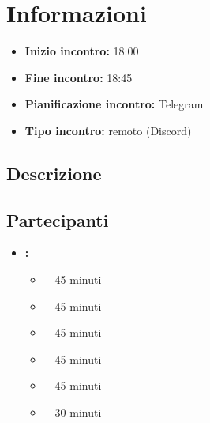 \section{Informazioni}
\begin{itemize}
	\item \textbf{Inizio incontro:} 18:00
	\item \textbf{Fine incontro:} 18:45
	\item \textbf{Pianificazione incontro:} Telegram
	\item \textbf{Tipo incontro:} remoto (Discord)
\end{itemize}

\subsection{Descrizione}
\DocDescription

\subsection{Partecipanti}

\begin{itemize}
	\item \textbf{\GroupName:}
	\begin{itemize}
		\item \tommaso \ \rightarrow\ 45 minuti
		\item \marco \ \rightarrow\ 45 minuti
		\item \sebastiano \ \rightarrow\ 45 minuti
		\item \martina \ \rightarrow\ 45 minuti
		\item \riccardo \ \rightarrow\ 45 minuti
		\item \mattia \ \rightarrow\ 30 minuti
	\end{itemize}
\end{itemize}

\clearpage
